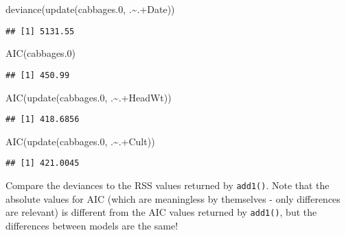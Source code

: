 \documentclass[
]{article}
\newenvironment{Shaded}{\begin{snugshade}}{\end{snugshade}}
\newcommand{\FloatTok}[1]{\textcolor[rgb]{0.00,0.00,0.81}{#1}}
\newcommand{\FunctionTok}[1]{\textcolor[rgb]{0.00,0.00,0.00}{#1}}
\newcommand{\NormalTok}[1]{#1}
\newcommand{\SpecialCharTok}[1]{\textcolor[rgb]{0.00,0.00,0.00}{#1}}
\begin{document}
\begin{Shaded}
\begin{Highlighting}[]
\FunctionTok{deviance}\NormalTok{(}\FunctionTok{update}\NormalTok{(cabbages}\FloatTok{.0}\NormalTok{, .}\SpecialCharTok{\textasciitilde{}}\NormalTok{.}\SpecialCharTok{+}\NormalTok{Date))}
\end{Highlighting}
\end{Shaded}

\begin{verbatim}
## [1] 5131.55
\end{verbatim}

\begin{Shaded}
\begin{Highlighting}[]
\FunctionTok{AIC}\NormalTok{(cabbages}\FloatTok{.0}\NormalTok{)}
\end{Highlighting}
\end{Shaded}

\begin{verbatim}
## [1] 450.99
\end{verbatim}

\begin{Shaded}
\begin{Highlighting}[]
\FunctionTok{AIC}\NormalTok{(}\FunctionTok{update}\NormalTok{(cabbages}\FloatTok{.0}\NormalTok{, .}\SpecialCharTok{\textasciitilde{}}\NormalTok{.}\SpecialCharTok{+}\NormalTok{HeadWt))}
\end{Highlighting}
\end{Shaded}

\begin{verbatim}
## [1] 418.6856
\end{verbatim}

\begin{Shaded}
\begin{Highlighting}[]
\FunctionTok{AIC}\NormalTok{(}\FunctionTok{update}\NormalTok{(cabbages}\FloatTok{.0}\NormalTok{, .}\SpecialCharTok{\textasciitilde{}}\NormalTok{.}\SpecialCharTok{+}\NormalTok{Cult))}
\end{Highlighting}
\end{Shaded}

\begin{verbatim}
## [1] 421.0045
\end{verbatim}

Compare the deviances to the RSS values returned by \texttt{add1()}.
Note that the absolute values for AIC (which are meaningless by
themselves - only differences are relevant) is different from the AIC
values returned by \texttt{add1()}, but the differences between models
are the same!
\end{document}
